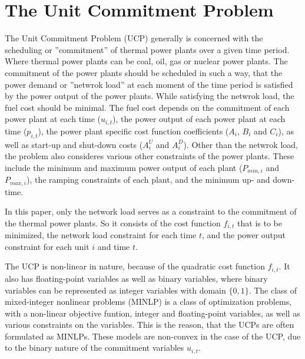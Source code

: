 \section{The Unit Commitment Problem} \label{intro:ucp}

The Unit Commitment Problem (UCP) generally is concerned with the scheduling or ''commitment''
of thermal power plants over a given time period.
Where thermal power plants can be coal, oil, gas or nuclear power plants.
The commitment of the power plants should be scheduled in such a way,
that the power demand or ''netwrok load'' at each moment of the time period
is satisfied by the power output of the power plants.
While satisfying the netwrok load, the fuel cost should be minimal.
The fuel cost depends on the commitment of each power plant at each time ($u_{i, t}$),
the power output of each power plant at each time ($p_{i, t}$),
the power plant specific cost function coefficients ($A_i$, $B_i$ and $C_i$),
as well as start-up and shut-down costs ($A_{i}^{U}$ and $A_{i}^{D}$).
Other than the netwrok load, the problem also consideres various other constraints of the power plants.
These include the minimum and maximum power output of each plant ($P_{min,i}$ and $P_{max,i}$),
the ramping constraints of each plant,
and the minimum up- and down-time.
\cite{Baldick1995}

In this paper, only the network load serves as a constraint to the commitment of the thermal power plants.
So it consists of the cost function $f_{i, t}$ that is to be minimized,
the network load constraint for each time $t$,
and the power output constraint for each unit $i$ and time $t$.

The UCP is non-linear in nature, because of the quadratic cost function $f_{i, t}$.
It also has floating-point variables as well as binary variables,
where binary variables can be represented as integer variables with domain $\{0, 1\}$.
The class of mixed-integer nonlinear problems (MINLP) is a class of optimization problems,
with a non-linear objective funtion,
integer and floating-point variables,
as well as various constraints on the variables.
This is the reason, that the UCPs are often formulated as MINLPs.
These models are non-convex in the case of the UCP, due to the binary nature of the commitment variables $u_{i, t}$.
\cite{Baldick1995, Abujarad2017}